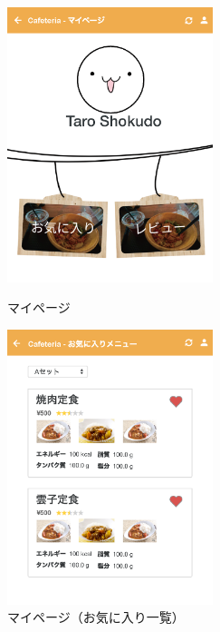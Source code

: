 \documentclass[a4paper]{ltjsarticle}
\begin{document}
        \begin{figure}[ht]
            \begin{minipage}[t]{.49\textwidth}
                \center
                \includegraphics[width=60mm]{ui/my-page.png}
                \caption{マイページ}
                \label{img:my-page}
            \end{minipage}
            \begin{minipage}[t]{.49\textwidth}
                \center
                \includegraphics[width=60mm]{ui/liked-list.png}
                \caption{マイページ（お気に入り一覧）}
                \label{img:liked-list}
            \end{minipage}
        \end{figure}
    \clearpage
\end{document}
